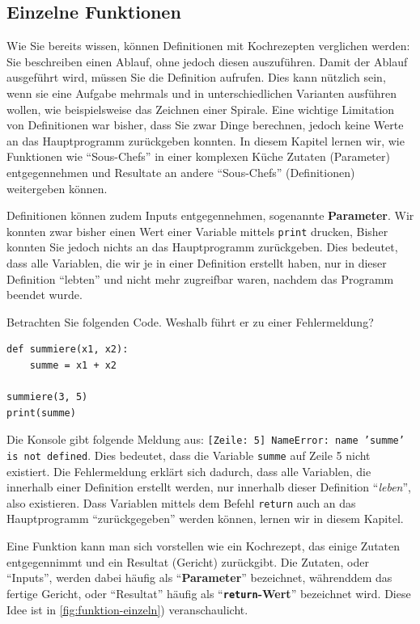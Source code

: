 \subsection{Einzelne Funktionen}

Wie Sie bereits wissen, können Definitionen mit Kochrezepten verglichen werden: Sie beschreiben einen Ablauf, ohne jedoch diesen auszuführen. Damit der Ablauf ausgeführt wird, müssen Sie die Definition aufrufen. Dies kann nützlich sein, wenn sie eine Aufgabe mehrmals und in unterschiedlichen Varianten ausführen wollen, wie beispielsweise das Zeichnen einer Spirale. Eine wichtige Limitation von Definitionen war bisher, dass Sie zwar Dinge berechnen, jedoch keine Werte an das Hauptprogramm zurückgeben konnten. In diesem Kapitel lernen wir, wie Funktionen wie ``Sous-Chefs'' in einer komplexen Küche Zutaten (Parameter) entgegennehmen und Resultate an andere ``Sous-Chefs''  (Definitionen) weitergeben können.


Definitionen können zudem Inputs entgegennehmen, sogenannte \textbf{Parameter}. Wir konnten zwar bisher einen Wert einer Variable mittels \lstinline|print| drucken, Bisher konnten Sie jedoch nichts an das Hauptprogramm zurückgeben. Dies bedeutet, dass alle Variablen, die wir je in einer Definition erstellt haben, nur in dieser Definition ``lebten'' und nicht mehr zugreifbar waren, nachdem das Programm beendet wurde.

\begin{myexample}\label{ex:sum-noreturn}
Betrachten Sie folgenden Code. Weshalb führt er zu einer Fehlermeldung?
\begin{lstlisting}
def summiere(x1, x2):
    summe = x1 + x2
    
summiere(3, 5)
print(summe)
\end{lstlisting}
Die Konsole gibt folgende Meldung aus: \texttt{[Zeile: 5] NameError: name 'summe' is not defined}. Dies bedeutet, dass die Variable \lstinline|summe| auf Zeile 5 nicht existiert. Die Fehlermeldung erklärt sich dadurch, dass alle Variablen, die innerhalb einer Definition erstellt werden, nur innerhalb dieser Definition ``\textit{leben}'', also existieren. Dass Variablen mittels dem Befehl \lstinline|return| auch an das Hauptprogramm ``zurückgegeben'' werden können, lernen wir in diesem Kapitel.
\end{myexample}

Eine Funktion kann man sich vorstellen wie ein Kochrezept, das einige Zutaten entgegennimmt und ein Resultat (Gericht) zurückgibt. Die Zutaten, oder ``Inputs'', werden dabei häufig als ``\textbf{Parameter}'' bezeichnet, währenddem das fertige Gericht, oder ``Resultat'' häufig als ``\textbf{\lstinline|return|-Wert}'' bezeichnet wird. Diese Idee ist in \cref{fig:funktion-einzeln}) veranschaulicht.

